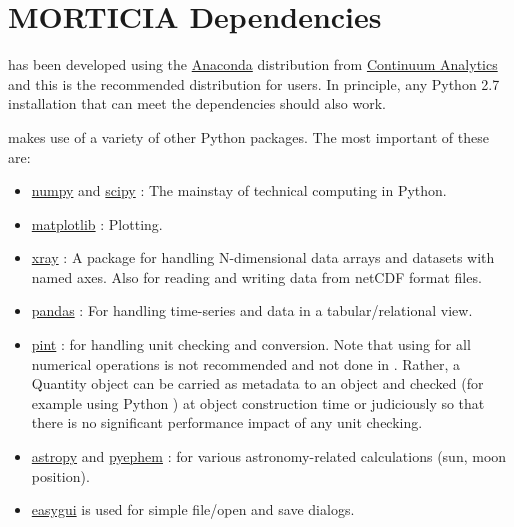 \documentclass[a4paper,10pt,english]{sphinxmanual}
\begin{document}
\section{MORTICIA Dependencies}
\label{how_to_use:morticia-dependencies}
 has been developed using the \href{https://www.continuum.io/downloads}{Anaconda} distribution from
\href{https://www.continuum.io/}{Continuum Analytics} and this is the recommended distribution for  users.
In principle, any Python 2.7 installation that can meet the dependencies should also work.

 makes use of a variety of other Python packages. The most important of these are:
\begin{itemize}
\item {} 
\href{http://www.numpy.org/}{numpy} and \href{http://www.scipy.org/}{scipy} : The mainstay of technical computing in Python.

\item {} 
\href{http://www.matplotlib.org/}{matplotlib} : Plotting.

\item {} 
\href{http://xray.readthedocs.org/en/stable/}{xray} : A package for handling N-dimensional data arrays and datasets with named axes. Also for reading and writing
data from netCDF format files.

\item {} 
\href{http://pandas.pydata.org/}{pandas} : For handling time-series and data in a tabular/relational view.

\item {} 
\href{https://pint.readthedocs.org/en/0.6/}{pint} : for handling unit checking and conversion. Note that using  for all numerical operations is not
recommended and not done in . Rather, a  Quantity object can be carried as metadata to an
 object and checked (for example using Python ) at object construction time or judiciously
so that there is no significant performance impact of any unit checking.

\item {} 
\href{http://www.astropy.org/}{astropy} and \href{http://rhodesmill.org/pyephem/}{pyephem} : for various astronomy-related calculations (sun, moon position).

\item {} 
\href{http://easygui.sourceforge.net/}{easygui} is used for simple file/open and save dialogs.


\end{itemize}
\end{document}
